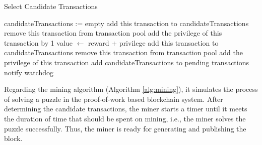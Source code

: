 \clearpage
\vspace*{\fill}
\begin{algorithm}[htb]
    \caption{Select Candidate Transactions}
    \label{alg:select candidate transactions}
\begin{algorithmic}[1]
    \State candidateTransactions := empty
    \State
                \State add this transaction to candidateTransactions
                \State remove this transaction from transaction pool
            \Else
                \State add the privilege of this transaction by 1
            \EndIf
        \EndFor
            \State value $\gets$ reward $+$ privilege
                \State add this transaction to candidateTransactions
                \State remove this transaction from transaction pool
            \Else
                \State add the privilege of this transaction
            \EndIf
        \EndFor
    \EndIf
    \State
        \State {}
    \Else
        \State add candidateTransactions to pending transactions
    \EndIf
    \State
    \State notify watchdog
    \EndProcedure
\end{algorithmic}
\end{algorithm}
\vspace*{\fill}

\clearpage

\vspace*{\fill}
Regarding the mining algorithm (Algorithm \ref{alg:mining}), it simulates the process of solving a puzzle in the proof-of-work based blockchain system. After determining the candidate transactions, the miner starts a timer until it meets the duration of time that should be spent on mining, i.e., the miner solves the puzzle successfully. Thus, the miner is ready for generating and publishing the block.


